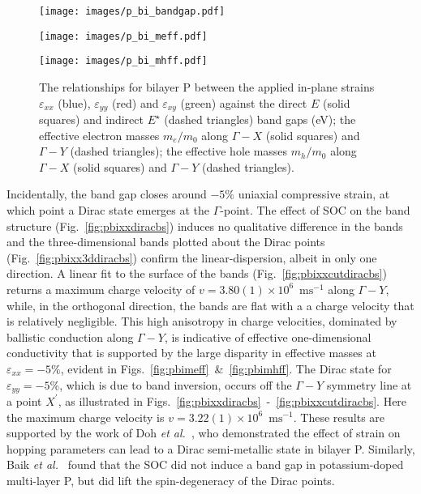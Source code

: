 \begin{figure}[th!]
\begin{subfloat}{
\texttt{[image: images/p\_bi\_bandgap.pdf]}
  \label{fig:pbibg}}
\end{subfloat}
%
\begin{subfloat}[Bilayer P $m_e/m_0$]{
\texttt{[image: images/p\_bi\_meff.pdf]}
  \label{fig:pbimeff}}
\end{subfloat}
%
\begin{subfloat}[Bilayer P $m_h/m_0$]{
\texttt{[image: images/p\_bi\_mhff.pdf]}
  \label{fig:pbimhff}}
\end{subfloat}
%
\caption[Electronic properties of bilayer phosphorus for in-plane strains]
{The relationships for bilayer P between 
the applied in-plane strains $\varepsilon_{xx}$ (blue),
$\varepsilon_{yy}$ (red) and $\varepsilon_{xy}$ (green) against 
%
\protect{}
the direct $E$ (solid  squares) and 
indirect $E^\star$ (dashed triangles) band gaps (eV);
%
\protect{}
the effective electron masses $m_e/m_0$
 along $\Gamma-X$ (solid squares) and 
$\Gamma-Y$ (dashed triangles);
%
\protect{} 
the effective hole masses $m_h/m_0$ 
along $\Gamma-X$ (solid squares) and 
$\Gamma-Y$ (dashed triangles).}
\label{fig:p_bi_elec_properties}
\end{figure}


Incidentally, the band gap closes 
around $-5\%$ uniaxial compressive strain, 
at which point a Dirac {state} emerges 
at the $\Gamma$-point. 
%
{The effect of SOC 
on the band structure 
(Fig.~\ref{fig:pbixxdiracbs}) 
induces no qualitative difference 
in the bands 
and the three-dimensional 
bands plotted about the Dirac points 
(Fig.~\ref{fig:pbixx3ddiracbs})
confirm the linear-dispersion,  
albeit in only one direction.
%
A linear fit to the 
surface of the bands 
(Fig.~\ref{fig:pbixxcutdiracbs}) 
 returns a maximum charge velocity 
of $v=3.80(1)\times 10^6$~$\textrm{ms}^{-1}$ 
along $\Gamma-Y$, 
while, in the orthogonal direction, 
the bands are flat with a  
a charge velocity that is relatively negligible.
%
This high anisotropy in charge velocities, 
dominated by ballistic conduction along $\Gamma-Y$, 
is indicative of effective one-dimensional conductivity 
that is supported by 
the large disparity in effective 
masses at $\varepsilon_{xx}=-5\%$, 
evident in Figs.~\ref{fig:pbimeff}~\&~\ref{fig:pbimhff}.}
%
The Dirac state for $\varepsilon_{yy}=-5\%$, 
which is due to band inversion, 
occurs off the $\Gamma-Y$ symmetry line
at a point $X^\prime$, 
as illustrated in Figs.~\ref{fig:pbixxdiracbs}~-~\ref{fig:pbixxcutdiracbs}.
%
Here the maximum charge velocity is
$v=3.22(1)\times 10^6$~$\textrm{ms}^{-1}$.
%
These results are supported by 
the work of Doh \emph{et al.}~\cite{2053-1583-4-2-025071}, 
who demonstrated the effect of strain 
on hopping parameters 
can lead to a Dirac semi-metallic state in bilayer P.
%
Similarly, Baik \emph{et al.}~\cite{doi:10.1021/acs.nanolett.5b04106} 
found that the SOC 
did not induce a band gap 
in potassium-doped multi-layer P,  
but did lift the spin-degeneracy of the Dirac points.

